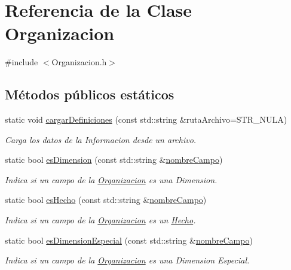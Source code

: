 \hypertarget{classOrganizacion}{\section{\-Referencia de la \-Clase \-Organizacion}
\label{classOrganizacion}
}


{\ttfamily \#include $<$\-Organizacion.\-h$>$}

\subsection*{\-Métodos públicos estáticos}
\begin{DoxyCompactItemize}
\item 
static void \hyperlink{classOrganizacion_a78413f92453d9efa234a49dbb2afc4b9}{cargar\-Definiciones} (const std\-::string \&ruta\-Archivo=\-S\-T\-R\-\_\-\-N\-U\-L\-A)
\begin{DoxyCompactList}\small\item\em \-Carga los datos de la \-Informacion desde un archivo. \end{DoxyCompactList}\item 
static bool \hyperlink{classOrganizacion_a898670aaa00e73db489c2099fb7d5a14}{es\-Dimension} (const std\-::string \&\hyperlink{classOrganizacion_a07eb9a61b81f4d2d3aa4fc66ffdbbbfa}{nombre\-Campo})
\begin{DoxyCompactList}\small\item\em \-Indica si un campo de la \hyperlink{classOrganizacion}{\-Organizacion} es una \-Dimension. \end{DoxyCompactList}\item 
static bool \hyperlink{classOrganizacion_a27fad2197243739ae9ea80fe06382998}{es\-Hecho} (const std\-::string \&\hyperlink{classOrganizacion_a07eb9a61b81f4d2d3aa4fc66ffdbbbfa}{nombre\-Campo})
\begin{DoxyCompactList}\small\item\em \-Indica si un campo de la \hyperlink{classOrganizacion}{\-Organizacion} es un \hyperlink{classHecho}{\-Hecho}. \end{DoxyCompactList}\item 
static bool \hyperlink{classOrganizacion_aa08d3a99ce2020576dee9cbefa60ee2e}{es\-Dimension\-Especial} (const std\-::string \&\hyperlink{classOrganizacion_a07eb9a61b81f4d2d3aa4fc66ffdbbbfa}{nombre\-Campo})
\begin{DoxyCompactList}\small\item\em \-Indica si un campo de la \hyperlink{classOrganizacion}{\-Organizacion} es una \-Dimension \-Especial. \end{DoxyCompactList}\item 

\end{DoxyCompactItemize}

